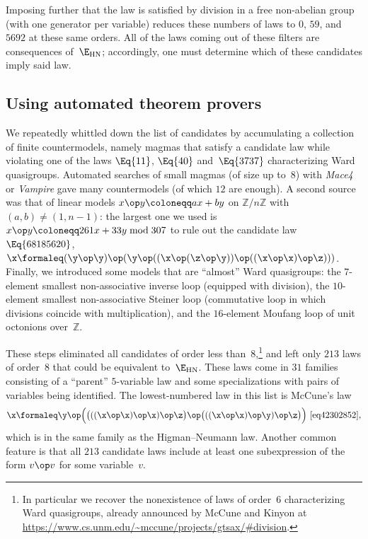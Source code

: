Imposing further that the law is satisfied by division in a free non-abelian group (with one generator per variable) reduces these numbers of laws to $0$, $59$, and $\num{5692}$ at these same orders.  All of the laws coming out of these filters are consequences of~$\E_{\mathrm{HN}}$; accordingly, one must determine which of these candidates imply said law.

\subsection{Using automated theorem provers}

We repeatedly whittled down the list of candidates by accumulating a collection of finite countermodels, namely magmas that satisfy a candidate law while violating one of the laws $\Eq{11}$, $\Eq{40}$ and~$\Eq{3737}$ characterizing Ward quasigroups.  Automated searches of small magmas (of size up to~$8$) with \emph{Mace4} or \emph{Vampire} gave many countermodels (of which $12$ are enough).  A second source was that of linear models $x \op y \coloneqq ax+by$ on $\mathbb{Z}/n\mathbb{Z}$ with $(a,b)\neq(1,n-1)$: the largest one we used is $x \op y \coloneqq 261x + 33y \bmod 307$ to rule out the candidate law $\Eq{68185620}$, $\x \formaleq (\y \op \y) \op (\y \op ((\x \op (\z \op \y)) \op ((\x \op \x) \op \z)))$.  Finally, we introduced some models that are ``almost'' Ward quasigroups: the $7$-element smallest non-associative inverse loop (equipped with division), the $10$-element smallest non-associative Steiner loop (commutative loop in which divisions coincide with multiplication), and the $16$-element Moufang loop of unit octonions over~$\mathbb{Z}$.

These steps eliminated all candidates of order less than~$8$,\footnote{In particular we recover the nonexistence of laws of order~$6$ characterizing Ward quasigroups, already announced by McCune and Kinyon at \url{https://www.cs.unm.edu/~mccune/projects/gtsax/\#division}.} and left only $213$ laws of order~$8$ that could be equivalent to~$\E_{\mathrm{HN}}$.  These laws come in $31$ families consisting of a ``parent'' $5$-variable law and some specializations with pairs of variables being identified.  The lowest-numbered law in this list is McCune's law
\[
\x \formaleq \y \op \Bigl(\bigl(((\x \op \x) \op \x) \op \z\bigr) \op \bigl(((\x \op \x) \op \y) \op \z\bigr)\Bigr) \ \eqref{eq42302852},
\]
which is in the same family as the Higman--Neumann law.  Another common feature is that all $213$ candidate laws include at least one subexpression of the form $v \op v$ for some variable~$v$.

